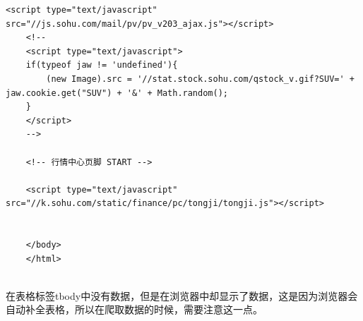 \documentclass[UTF8,12pt]{article}
\begin{document}
\begin{lstlisting}[title=股票代码300117的界面html源码,frame=shadowbox]
    <script type="text/javascript" src="//js.sohu.com/mail/pv/pv_v203_ajax.js"></script>
    <!--
    <script type="text/javascript">
    if(typeof jaw != 'undefined'){
        (new Image).src = '//stat.stock.sohu.com/qstock_v.gif?SUV=' +  jaw.cookie.get("SUV") + '&' + Math.random();
    }
    </script>
    -->
    
    <!-- 行情中心页脚 START -->
    
    <script type="text/javascript" src="//k.sohu.com/static/finance/pc/tongji/tongji.js"></script>
    
    
    </body>
    </html>
    
\end{lstlisting}
在表格标签tbody中没有数据，但是在浏览器中却显示了数据，这是因为浏览器会自动补全表格，所以在爬取数据的时候，需要注意这一点。
\end{document}
